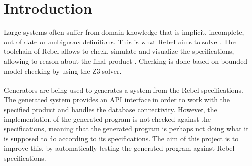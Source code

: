 \chapter{Introduction}
\label{chp:intro}
Large systems often suffer from domain knowledge that is implicit, incomplete, out of date or ambiguous definitions. This is what Rebel aims to solve \cite{stoel2016solving}. The toolchain of Rebel allows to check, simulate and visualize the specifications, allowing to reason about the final product \cite{stoelcase}. Checking is done based on bounded model checking by using the Z3 solver.\\
\\
Generators are being used to generates a system from the Rebel specifications. The generated system provides an API interface in order to work with the specified product and handles the database connectivity. However, the implementation of the generated program is not checked against the specifications, meaning that the generated program is perhaps not doing what it is supposed to do according to its specifications. The aim of this project is to improve this, by automatically testing the generated program against Rebel specifications.


